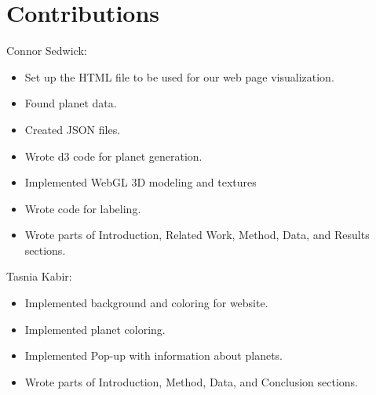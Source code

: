 \documentclass[journal]{vgtc}                %
\begin{document}
\section{Contributions}
Connor Sedwick:
\begin{itemize}
\item Set up the HTML file to be used for our web page visualization.
\item Found planet data.
\item Created JSON files.
\item Wrote d3 code for planet generation.
\item Implemented WebGL 3D modeling and textures
\item Wrote code for labeling.
\item Wrote parts of Introduction, Related Work, Method, Data, and Results sections.
\end{itemize}

\noindent Tasnia Kabir:
\begin{itemize}
\item Implemented background and coloring for website.
\item Implemented planet coloring.
\item Implemented Pop-up with information about planets.
\item Wrote parts of Introduction, Method, Data, and Conclusion sections.
\end{itemize}
%
%
%
%
%
%
\end{document}
